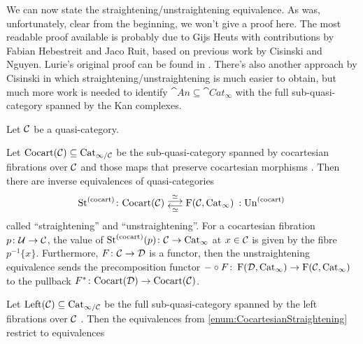 We can now state the straightening/unstraightening equivalence. As was, unfortunately, clear from the beginning, we won't give a proof here. The most readable proof available is probably due to Gijs Heuts \cite{HeutsStraightening} with contributions by Fabian Hebestreit and Jaco Ruit, based on previous work by Cisinski and Nguyen. Lurie's original proof can be found in \cite[\S\href{https://people.math.harvard.edu/~lurie/papers/HTT.pdf\#section.3.2}{3.2}]{HTT}. There's also another approach by Cisinski \cite{Cisinski} in which straightening/unstraightening is much easier to obtain, but much more work is needed to identify $\cat{An}\subseteq \cat{Cat}_\infty$ with the full sub-quasi-category spanned by the Kan complexes.
\begin{thm}\label{thm:Straightening}
	Let $\mathcal{C}$ be a quasi-category.
	\begin{alphanumerate}
		\item Let $\mathrm{Cocart}(\mathcal{C})\subseteq\mathrm{Cat}_{\infty/\mathcal{C}}$ be the  sub-quasi-category spanned by cocartesian fibrations over $\mathcal{C}$ and those maps that preserve cocartesian morphisms . Then there are inverse equivalences of quasi-categories\label{enum:CocartesianStraightening}
		\begin{equation*}
			\operatorname{St}^{(\mathrm{cocart})}\colon \cat{Cocart}(\Cc) \underset{\simeq}{\mathrel{\smash{\underset{\smash{\raisebox{0.35em}{$\longleftarrow$}}}{\overset{\smash{\raisebox{-0.35em}{$\overset{\simeq}{\longrightarrow}$}}}{\phantom{\longrightarrow}}}}}}\F\!\left(\Cc,\cat{Cat}_\infty\right)\noloc \operatorname{Un}^{(\mathrm{cocart})}\vphantom{\overset{\simeq}{\overline{x}}}
		\end{equation*}
		called \enquote{straightening} and \enquote{unstraightening}. For a cocartesian fibration $p\colon \mathcal{U}\rightarrow \mathcal{C}$, the value of $\operatorname{St}^{(\mathrm{cocart})}(p)\colon \mathcal{C}\rightarrow\mathrm{Cat}_\infty$ at $x\in \mathcal{C}$ is given by the fibre $p^{-1}\{x\}$. Furthermore, $F\colon \mathcal{C}\rightarrow \mathcal{D}$ is a functor, then the unstraightening equivalence sends the precomposition functor $-\circ F\colon \operatorname{F}(\mathcal{D},\mathrm{Cat}_\infty)\rightarrow \operatorname{F}(\mathcal{C},\mathrm{Cat}_\infty)$ to the pullback $F^*\colon \mathrm{Cocart}(\mathcal{D})\rightarrow\mathrm{Cocart}(\mathcal{C})$.
		\item Let $\mathrm{Left}(\mathcal{C})\subseteq \mathrm{Cat}_{\infty/\mathcal{C}}$ be the full sub-quasi-category spanned by the left fibrations over $\mathcal{C}$ . Then the equivalences from \cref{enum:CocartesianStraightening} restrict to equivalences\label{enum:LeftStraightening}

\end{alphanumerate}
\end{thm}
